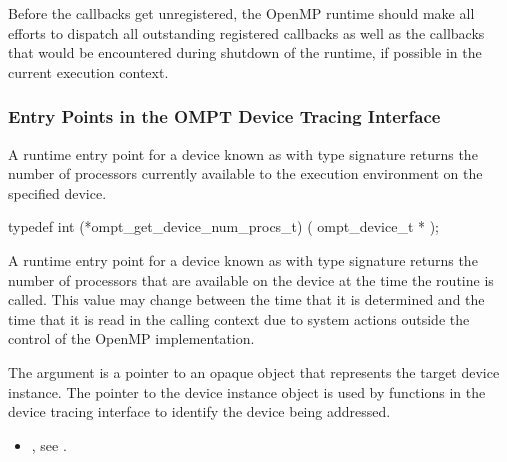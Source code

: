 Before the callbacks get unregistered, the OpenMP runtime should make all efforts to 
dispatch all outstanding registered callbacks as well as the callbacks that would be 
encountered during shutdown of the runtime, if possible in the current execution context.

\subsubsection{Entry Points in the OMPT Device Tracing Interface}
\label{sec:ompt-tracing-entry-points}


\label{sec:ompt_get_device_num_procs_t}

\summary

A runtime entry point for a device known as
 with type signature
 returns
the number of processors currently available to the execution
environment on the specified device.

\format
\begin{ccppspecific}
\begin{omptInquiry}
typedef int (*ompt_get_device_num_procs_t) (
  ompt_device_t *
);
\end{omptInquiry}
\end{ccppspecific}

\descr
A runtime entry point for a device known
as  with type signature
 returns the
number of processors that are available on the device at the time
the routine is called. This value may change between the time that
it is determined and the time that it is read in the calling context due to
system actions outside the control of the OpenMP implementation.

\argdesc

The argument  is a pointer to an opaque object that
represents the target device instance. The pointer to the device
instance object is used by functions in the device tracing interface
to identify the device being addressed.

\crossreferences
\begin{itemize}
\item {},
see .
\end{itemize}

\label{sec:ompt_get_device_time_t}

